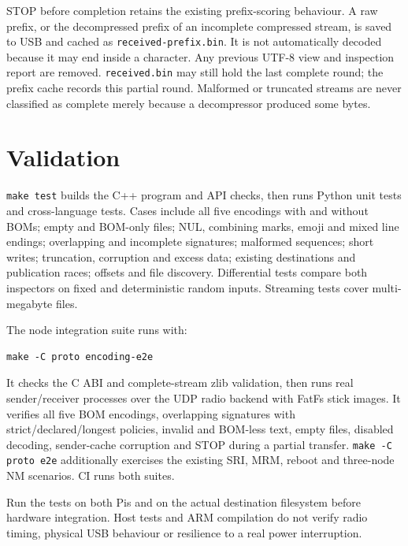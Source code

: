 \documentclass[10pt,a4paper]{article}
\begin{document}
STOP before completion retains the existing prefix-scoring behaviour. A raw prefix,
or the decompressed prefix of an incomplete compressed stream, is saved to USB
and cached as \texttt{received-prefix.bin}. It is not automatically decoded because
it may end inside a character. Any previous UTF-8 view and inspection report are
removed. \texttt{received.bin} may still hold the last complete round; the prefix
cache records this partial round. Malformed or truncated streams are never
classified as complete merely because a decompressor produced some bytes.

\section{Validation}
\texttt{make test} builds the C++ program and API checks, then runs Python unit
tests and cross-language tests. Cases include all five encodings with and without
BOMs; empty and BOM-only files; NUL, combining marks, emoji and mixed line endings;
overlapping and incomplete signatures; malformed sequences; short writes;
truncation, corruption and excess data; existing destinations and publication
races; offsets and file discovery. Differential tests compare both inspectors on
fixed and deterministic random inputs. Streaming tests cover multi-megabyte files.

The node integration suite runs with:
\begin{verbatim}
make -C proto encoding-e2e
\end{verbatim}
It checks the C ABI and complete-stream zlib
validation, then runs real sender/receiver processes over the UDP radio backend
with FatFs stick images. It verifies all five BOM encodings, overlapping signatures
with strict/declared/longest policies, invalid and BOM-less text, empty files,
disabled decoding, sender-cache corruption and STOP during a partial transfer.
\texttt{make -C proto e2e} additionally exercises the existing SRI, MRM, reboot and
three-node NM scenarios. CI runs both suites.

Run the tests on both Pis and on the actual destination filesystem before hardware
integration. Host tests and ARM compilation do not verify radio timing, physical
USB behaviour or resilience to a real power interruption.
\end{document}
